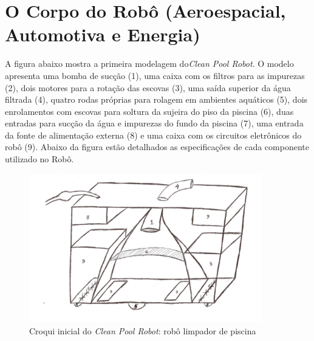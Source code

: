 \section{O Corpo do Robô (Aeroespacial, Automotiva e Energia)}
A figura abaixo mostra a primeira modelagem do\textit{Clean Pool Robot}. O modelo
apresenta uma bomba de sucção (1), uma caixa com os filtros para as impurezas
(2), dois motores para a rotação das escovas (3), uma saída superior da água
filtrada (4), quatro rodas próprias para rolagem em ambientes aquáticos (5),
dois enrolamentos com escovas para soltura da sujeira do piso da piscina (6),
duas entradas para sucção da água e impurezas do fundo da piscina (7), uma
entrada da fonte de alimentação externa (8) e uma caixa com os circuitos
eletrônicos do robô (9). Abaixo da figura estão detalhados as especificações
de cada componente utilizado no Robô.
\par
\begin{figure}[h]
  \centering
  \includegraphics[width=0.9\textwidth]{figures/croqui.png}
  \caption{ Croqui inicial do \textit{Clean Pool Robot}: robô limpador de piscina}
  \label{fig:schema-way-robot}
\end{figure}
\FloatBarrier